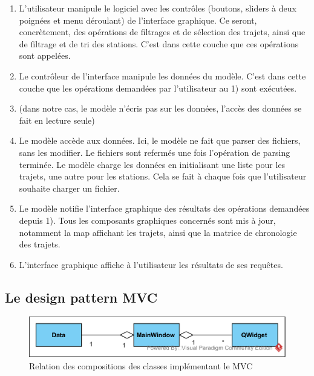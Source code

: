 \documentclass[12pt]{article}
\begin{document}
		\begin{enumerate}
		\item L'utilisateur manipule le logiciel avec les contrôles (boutons, sliders à deux
		poignées et menu déroulant) de l’interface graphique. Ce seront, concrètement,
		des opérations de filtrages et de sélection des trajets, ainsi que de filtrage
		et de tri des stations. C’est dans cette couche que ces opérations sont appelées.\\
		
		\item Le contrôleur de l’interface manipule les données du modèle. C’est dans cette
		couche que les opérations demandées par l’utilisateur au 1) sont exécutées.\\
		
		\item (dans notre cas, le modèle n’écris pas sur les données, l’accès des données se
		fait en lecture seule)\\
		
		\item Le modèle accède aux données. Ici, le modèle ne fait que parser des fichiers,
		sans les modifier. Le fichiers sont refermés une fois l’opération de parsing
		terminée. Le modèle charge les données en initialisant une liste pour les trajets,
		une autre pour les stations. Cela se fait à chaque fois que l’utilisateur
		souhaite charger un fichier.\\
		
		\item Le modèle notifie l’interface graphique des résultats des opérations demandées
		depuis 1). Tous les composants graphiques concernés sont mis à jour, notamment la
		map affichant les trajets, ainsi que la matrice de chronologie des trajets.\\
		
		\item L’interface graphique affiche à l'utilisateur les résultats de ses requêtes.\\
		\end{enumerate}

		\subsection{Le design pattern MVC}		
		\begin{figure}[!h]
		\begin{center}
		\includegraphics[scale=1]{dia_class_mvc.png}
		\caption{Relation des compositions des classes implémentant le MVC}
		\end{center}
		\end{figure}		
		
\end{document}
